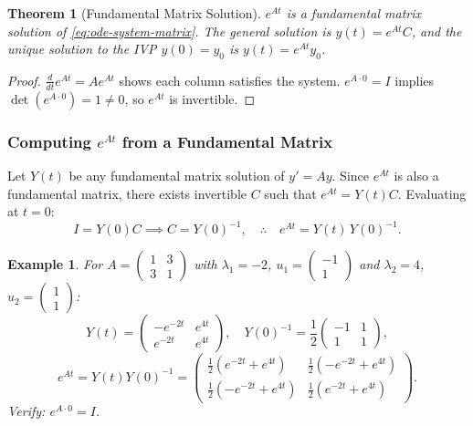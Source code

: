 \documentclass{article}
\newtheorem{theorem}{Theorem}
\newtheorem*{example}{Example}
\begin{document}
\begin{theorem}[Fundamental Matrix Solution]
    $e^{At}$ is a fundamental matrix solution of 
    \eqref{eq:ode-system-matrix}. The general solution is 
    $y(t) = e^{At}C$, and the unique solution to the IVP 
    $y(0) = y_0$ is $y(t) = e^{At}y_0$.
\end{theorem}

\begin{proof}
    $\frac{d}{dt}e^{At} = Ae^{At}$ shows each column satisfies 
    the system. $e^{A\cdot 0} = I$ implies $\det(e^{A\cdot 0}) = 
    1 \neq 0$, so $e^{At}$ is invertible.
\end{proof}

\subsubsection{Computing $e^{At}$ from a Fundamental Matrix}

Let $Y(t)$ be any fundamental matrix solution of $y' = Ay$. Since 
$e^{At}$ is also a fundamental matrix, there exists invertible 
$C$ such that $e^{At} = Y(t)C$. Evaluating at $t=0$:
\[I = Y(0)C \implies C = Y(0)^{-1}, \quad \therefore \quad 
e^{At} = Y(t)\,Y(0)^{-1}.\]

\begin{example}
    For $A = \begin{pmatrix}1&3\\3&1\end{pmatrix}$ with 
    $\lambda_1=-2$, $u_1=\begin{pmatrix}-1\\1\end{pmatrix}$ and 
    $\lambda_2=4$, $u_2=\begin{pmatrix}1\\1\end{pmatrix}$:
    \[Y(t) = \begin{pmatrix}-e^{-2t}&e^{4t}\\e^{-2t}&e^{4t}
    \end{pmatrix}, \quad Y(0)^{-1} = \frac{1}{2}
    \begin{pmatrix}-1&1\\1&1\end{pmatrix},\]
    \[e^{At} = Y(t)Y(0)^{-1} = \begin{pmatrix}
    \frac{1}{2}(e^{-2t}+e^{4t}) & \frac{1}{2}(-e^{-2t}+e^{4t})\\
    \frac{1}{2}(-e^{-2t}+e^{4t}) & \frac{1}{2}(e^{-2t}+e^{4t})
    \end{pmatrix}.\]
    Verify: $e^{A\cdot 0} = I$. \checkmark
\end{example}
\end{document}
